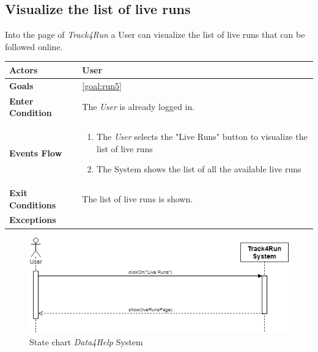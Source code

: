  \subsection{Visualize the list of live runs}
Into the page of \emph{Track4Run} a User can visualize the list of live runs that can be followed online.

\begin{table}[H]
	\centering
    
    \begin{tabular}{|p{3.5cm}|p{10.3cm}|}
    
    \hline
    \textbf{\large{Actors}}  			& \tabitem User 	\\
    				 					
    \hline
    \textbf{\large{Goals}} 				& \ref{goal:run5}\\
    
    \hline
    \textbf{\large{Enter Condition}}	& The \emph{User} is already logged in.		\\
    
    \hline
    \textbf{\large{Events Flow}}		& \begin{enumerate}[leftmargin=0.5cm]
                                          	\item The \emph{User} selects the "Live Runs" button to visualize the list of live runs  
                                          	 \item The System shows the list of all the available live runs
                                          \end{enumerate}
    										\\
    \hline
    \textbf{\large{Exit Conditions}}    & The list of live runs is shown.  \\
    
    \hline
    \textbf{\large{Exceptions}} 		& \\
    
    \hline
    
    
    \end{tabular}
	
\end{table}

\begin{figure}[H]
    \centering
    \includegraphics[scale=0.4]{Pictures/visListLiveRunsSeqDiag.png}
    \caption{State chart  \emph{Data4Help} System}
\end{figure}
